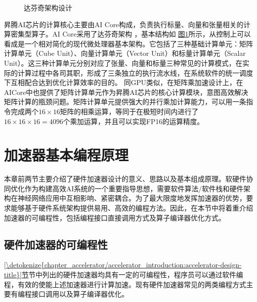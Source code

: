 \documentclass[letterpaper,10pt,english]{sphinxmanual}
\let\sphinxpxdimen\pdfpxdimen\else\newdimen\sphinxpxdimen
\begin{document}
\begin{figure}[H]
\centering
\capstart

\noindent\sphinxincludegraphics[width=800\sphinxpxdimen]{{davinci_architecture}.svg}
\caption{达芬奇架构设计}\label{\detokenize{chapter_accelerator/accelerator_architecture:id11}}\label{\detokenize{chapter_accelerator/accelerator_architecture:davinci-architecture}}\end{figure}

\sphinxAtStartPar
昇腾AI芯片的计算核心主要由AI
Core构成，负责执行标量、向量和张量相关的计算密集型算子。AI
Core采用了达芬奇架构 ，基本结构如
\hyperref[\detokenize{chapter_accelerator/accelerator_architecture:davinci-architecture}]{图\ref{\detokenize{chapter_accelerator/accelerator_architecture:davinci-architecture}}}所示，从控制上可以看成是一个相对简化的现代微处理器基本架构。它包括了三种基础计算单元：矩阵计算单元（Cube
Unit）、向量计算单元（Vector Unit）和标量计算单元（Scalar
Unit）。这三种计算单元分别对应了张量、向量和标量三种常见的计算模式，在实际的计算过程中各司其职，形成了三条独立的执行流水线，在系统软件的统一调度下互相配合达到优化计算效率的目的。
同GPU类似，在矩阵乘加速设计上，在AICore中也提供了矩阵计算单元作为昇腾AI芯片的核心计算模块，意图高效解决矩阵计算的瓶颈问题。矩阵计算单元提供强大的并行乘加计算能力，可以用一条指令完成两个\(16\times16\)矩阵的相乘运算，等同于在极短时间内进行了\(16\times16\times16=4096\)个乘加运算，并且可以实现FP16的运算精度。


\section{加速器基本编程原理}
\label{\detokenize{chapter_accelerator/accelerator_programming:accelerator-program-title}}\label{\detokenize{chapter_accelerator/accelerator_programming:id1}}\label{\detokenize{chapter_accelerator/accelerator_programming::doc}}
\sphinxAtStartPar
本章前两节主要介绍了硬件加速器设计的意义、思路以及基本组成原理。软硬件协同优化作为构建高效AI系统的一个重要指导思想，需要软件算法/软件栈和硬件架构在神经网络应用中互相影响、紧密耦合。为了最大限度地发挥加速器的优势，要求能够基于硬件系统架构提供易用、高效的编程方法。因此，在本节中将着重介绍加速器的可编程性，包括编程接口直接调用方式及算子编译器优化方式。


\subsection{硬件加速器的可编程性}
\label{\detokenize{chapter_accelerator/accelerator_programming:accelerator-programable-title}}\label{\detokenize{chapter_accelerator/accelerator_programming:id2}}
\sphinxAtStartPar
\hyperref[\detokenize{chapter_accelerator/accelerator_introduction:accelerator-design-title}]{\ref{\detokenize{chapter_accelerator/accelerator_introduction:accelerator-design-title}}节}节中列出的硬件加速器均具有一定的可编程性，程序员可以通过软件编程，有效的使能上述加速器进行计算加速。现有硬件加速器常见的两类编程方式主要有编程接口调用以及算子编译器优化。
\end{document}
